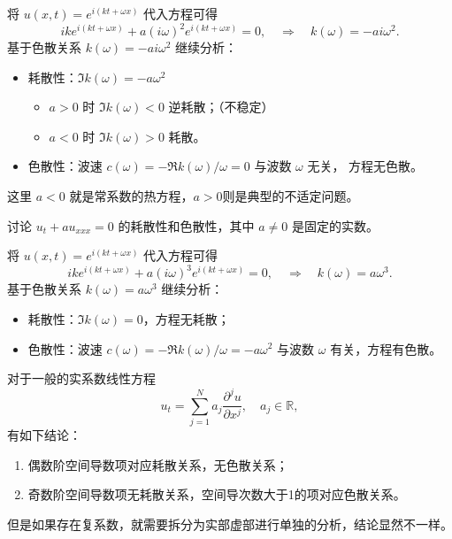 \begin{solution*}
    将 $u(x,t) = e^{i(k t+\omega x)}$ 代入方程可得
    \[
        i k e^{i(k t+\omega x)} + a (i \omega)^2 e^{i(k t+\omega x)} = 0,
        \quad \Rightarrow \quad
        k(\omega) = - a i \omega^2.
    \]
    基于色散关系 $k(\omega) = -a i \omega^2$ 继续分析：
    \begin{itemize}
        \item 耗散性：$\Im k(\omega) = -a \omega^2$
              \begin{itemize}
                  \item[(1)] $a>0$ 时 $\Im k(\omega) <0$ 逆耗散；（不稳定）
                  \item[(2)] $a<0$ 时 $\Im k(\omega) >0$ 耗散。
              \end{itemize}
        \item 色散性：波速 $c(\omega) = - \Re k(\omega) / \omega = 0$ 与波数 $\omega$ 无关，
              方程无色散。
    \end{itemize}
    这里 $a < 0$ 就是常系数的热方程，$a > 0$则是典型的不适定问题。
\end{solution*}


\begin{example}
    讨论 $u_t + a u_{xxx} = 0$ 的耗散性和色散性，其中 $a \neq 0 $ 是固定的实数。
\end{example}

\begin{solution*}
    将 $u(x,t) = e^{i(k t+\omega x)}$ 代入方程可得
    \[
        i k e^{i(k t+\omega x)} + a (i \omega)^3 e^{i(k t+\omega x)} = 0,
        \quad \Rightarrow \quad
        k(\omega) = a \omega^3.
    \]
    基于色散关系 $k(\omega) = a \omega^3$ 继续分析：
    \begin{itemize}
        \item 耗散性：$\Im k(\omega) = 0$，方程无耗散；
        \item 色散性：波速 $c(\omega) = - \Re k(\omega) / \omega = - a \omega^2$ 与波数 $\omega$ 有关，方程有色散。
    \end{itemize}
\end{solution*}

对于一般的实系数线性方程
\[
    u_t = \sum_{j=1}^N a_j \frac{\partial^j u}{\partial x^j},\quad a_j \in \mathbb{R},
\]
有如下结论：
\begin{enumerate}
    \item 偶数阶空间导数项对应耗散关系，无色散关系；
    \item 奇数阶空间导数项无耗散关系，空间导次数大于1的项对应色散关系。
\end{enumerate}
但是如果存在复系数，就需要拆分为实部虚部进行单独的分析，结论显然不一样。


